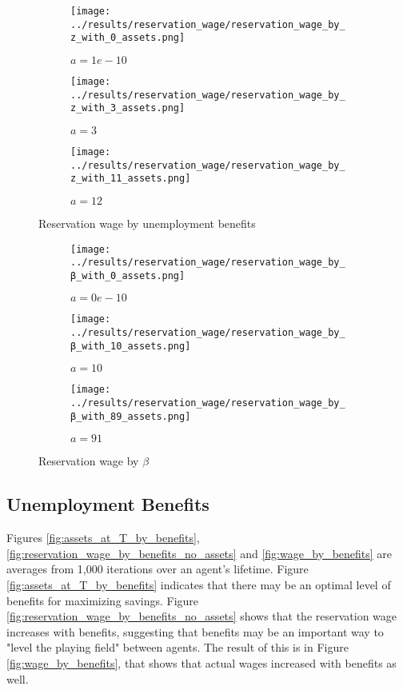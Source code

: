 \documentclass[12pt]{article}
\begin{document}
\begin{figure}[hbt!]

\begin{subfigure}{0.33\textwidth}
\texttt{[image: ../results/reservation\_wage/reservation\_wage\_by\_z\_with\_0\_assets.png]} \caption{$a=1e-10$}
\end{subfigure}%
\begin{subfigure}{0.33\textwidth}
\texttt{[image: ../results/reservation\_wage/reservation\_wage\_by\_z\_with\_3\_assets.png]}
\caption{$a=3$}
\end{subfigure}%
\begin{subfigure}{0.3\textwidth}
\texttt{[image: ../results/reservation\_wage/reservation\_wage\_by\_z\_with\_11\_assets.png]}
\caption{$a=12$}
\end{subfigure}

\caption{Reservation wage by unemployment benefits}
\label{fig:reservation_wage_by_z}
\end{figure}


\begin{figure}[hbt!]

\begin{subfigure}{0.33\textwidth}
\texttt{[image: ../results/reservation\_wage/reservation\_wage\_by\_β\_with\_0\_assets.png]} \caption{$a=0e-10$}
\end{subfigure}%
\begin{subfigure}{0.33\textwidth}
\texttt{[image: ../results/reservation\_wage/reservation\_wage\_by\_β\_with\_10\_assets.png]}
\caption{$a=10$}
\end{subfigure}%
\begin{subfigure}{0.3\textwidth}
\texttt{[image: ../results/reservation\_wage/reservation\_wage\_by\_β\_with\_89\_assets.png]}
\caption{$a=91$}
\end{subfigure}

\caption{Reservation wage by $\beta$}
\label{fig:reservation_wage_by_beta}
\end{figure}


\clearpage

\subsection{Unemployment Benefits}

Figures \ref{fig:assets_at_T_by_benefits}, \ref{fig:reservation_wage_by_benefits_no_assets} and \ref{fig:wage_by_benefits} are averages from 1,000 iterations over an agent's lifetime. Figure \ref{fig:assets_at_T_by_benefits} indicates that there may be an optimal level of benefits for maximizing savings. Figure \ref{fig:reservation_wage_by_benefits_no_assets} shows that the reservation wage increases with benefits, suggesting that benefits may be an important way to "level the playing field" between agents. The result of this is in Figure \ref{fig:wage_by_benefits}, that shows that actual wages increased with benefits as well.
\end{document}
